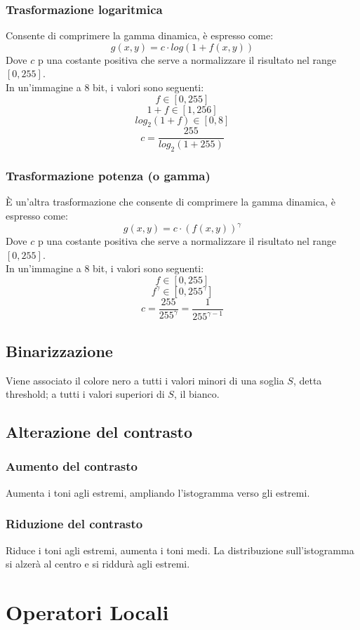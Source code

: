 \documentclass{report}
\begin{document}
	\subsection{Trasformazione logaritmica}
	Consente di comprimere la gamma dinamica, è espresso come:
	$$
	g(x,y) = c\cdot log(1+f(x,y))
	$$
	Dove $c$ p una costante positiva che serve a normalizzare il risultato nel range $[0,255]$.\\
	In un'immagine a 8 bit, i valori sono seguenti:
	$$
	f \in [0,255]
	$$
	$$
	1+f \in [1,256]
	$$
	$$
	log_2(1+f) \in [0,8]
	$$
	$$
	c = \frac{255}{log_2(1+255)}
	$$
	
	\subsection{Trasformazione potenza (o gamma)}
	È un'altra trasformazione che consente di comprimere la gamma dinamica, è espresso come:
	$$
	g(x,y) = c\cdot(f(x,y))^\gamma
	$$
	Dove $c$ p una costante positiva che serve a normalizzare il risultato nel range $[0,255]$.\\
	In un'immagine a 8 bit, i valori sono seguenti:
	$$
	f \in [0,255]
	$$
	$$
	f^\gamma \in [0,255^\gamma]
	$$
	$$
	c = \frac{255}{255^\gamma} = \frac{1}{255^{\gamma-1}}
	$$
	
	\section{Binarizzazione}
	Viene associato il colore nero a tutti i valori minori di una soglia $S$, detta threshold; a tutti i valori superiori di $S$, il bianco.
	\section{Alterazione del contrasto}
	\subsection{Aumento del contrasto}
	Aumenta i toni agli estremi, ampliando l'istogramma verso gli estremi.
	\subsection{Riduzione del contrasto}
	Riduce i toni agli estremi, aumenta i toni medi.
	La distribuzione sull'istogramma si alzerà al centro e si riddurà agli estremi.
	
	\chapter{Operatori Locali}
\end{document}
